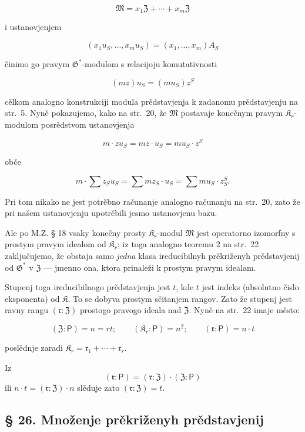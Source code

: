 \documentclass[11pt]{article}
\begin{document}
\[\mathfrak{M}=x_1\mathfrak{Z}+\cdots+x_m\mathfrak{Z}\]

i ustanovjenjem

\[(x_1u_S,\ldots,x_mu_S)=(x_1,\ldots,x_m)A_S\]

činimo go pravym \(\mathfrak G^*\)-modulom s relacijoju komutativnosti

\[(mz) u_S = (mu_S) z^S\]

cělkom analogno konstrukciji modula prědstavjenja k zadanomu prědstavjenju na str.~5. Nyně pokazujemo, kako na str.~20, že \(\mathfrak{M}\) postavaje konečnym pravym \(\mathfrak K_r\)-modulom posrědstvom ustanovjenja

\[m \cdot z u_S = mz \cdot u_S = mu_S \cdot z^S\]

obče

\[m \cdot \sum z_S u_S = \sum m z_S \cdot u_S = \sum m u_S \cdot z_S^S.\]

Pri tom nikako ne jest potrěbno računanje analogno računanju na str.~20, zato že pri našem ustanovjenju upotrěbili jesmo ustanovjenu bazu.

Ale po M.Z. § 18 vsaky konečny prosty \(\mathfrak K_r\)-modul \(\mathfrak{M}\) jest operatorno izomorfny s prostym pravym idealom od \(\mathfrak K_r\); iz toga analogno teoremu 2 na str.~22 zaključujemo, že obstaja samo \emph{jedna} klasa ireducibilnyh prěkriženyh prědstavjenij od \(\mathfrak{G}^*\) v \(\mathfrak Z\) --- jmenno ona, ktora prinaleži k prostym pravym idealam.

Stupenj toga ireducibilnogo prědstavjenja jest \(t\), kde \(t\) jest indeks (absolutno čislo eksponenta) od \(\mathfrak K\). To se dobyva prostym sčitanjem rangov. Zato že stupenj jest ravny rangu \((\mathfrak r:\mathfrak Z)\) prostogo pravogo ideala nad \(\mathfrak Z\). Nyně na str.~22 imaje město:

\[
(\mathfrak Z:\mathsf{P})=n=rt;\qquad (\mathfrak K_r:\mathsf{P})=n^2;\qquad (\mathfrak r:\mathsf{P})=n\cdot t
\]

poslědnje zaradi \(\mathfrak K_r = \mathfrak{r}_1 + \cdots + \mathfrak{r}_r\).

Iz
\[(\mathfrak{r}: \mathsf{P}) = (\mathfrak{r}: \mathfrak Z) \cdot (\mathfrak Z: \mathsf{P})\]
ili \(n \cdot t = (\mathfrak{r}: \mathfrak Z) \cdot n\) slěduje zato \((\mathfrak{r}: \mathfrak Z) = t\).

\subsection*{§ 26. Množenje prěkriženyh prědstavjenij}\label{multiplikation-der-verschraenkten-darstellungen}
\end{document}
